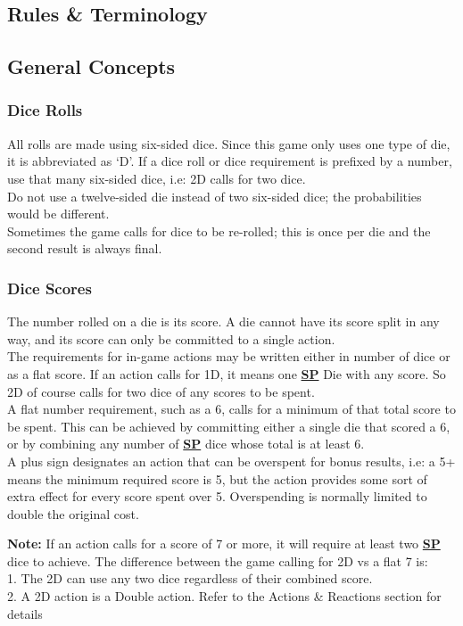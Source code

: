 \documentclass[12pt]{article}
\newcommand{\refto}[1]{\hyperlink{#1}{\textbf{#1}}}
\begin{document}
\begin{multicols*}{2}

\setlength{\parindent}{0pt}
\section{Rules \& Terminology}
\subsection{General Concepts}
\subsubsection*{Dice Rolls}
All rolls are made using six-sided dice. Since this game only uses one type of die, it is abbreviated as ‘D’. If a dice roll or dice requirement is prefixed by a number, use that many six-sided dice, i.e: 2D calls for two dice.\\
Do not use a twelve-sided die instead of two six-sided dice; the probabilities would be different.\\
Sometimes the game calls for dice to be re-rolled; this is once per die and the second result is always final.

\subsubsection*{Dice Scores}
The number rolled on a die is its score. A die cannot have its score split in any way, and its score can only be committed to a single action.\\
The requirements for in-game actions may be written either in number of dice or as a flat score. If an action calls for 1D, it means one \refto{SP} Die with any score. So 2D of course calls for two dice of any scores to be spent.\\
A flat number requirement, such as a 6, calls for a minimum of that total score to be spent. This can be achieved by committing either a single die that scored a 6, or by combining any number of \refto{SP} dice whose total is at least 6.\\
A plus sign designates an action that can be overspent for bonus results, i.e: a 5+ means the minimum required score is 5, but the action provides some sort of extra effect for every score spent over 5. Overspending is normally limited to double the original cost.

\begin{tcolorbox}
\textbf{Note:} If an action calls for a score of 7 or more, it will require at least two \refto{SP} dice to achieve. The difference between the game calling for 2D vs a flat 7 is:\\
1. The 2D can use any two dice regardless of their combined score.\\
2. A 2D action is a Double action. Refer to the Actions \& Reactions section for details
\end{tcolorbox}


\end{multicols*}
\end{document}
